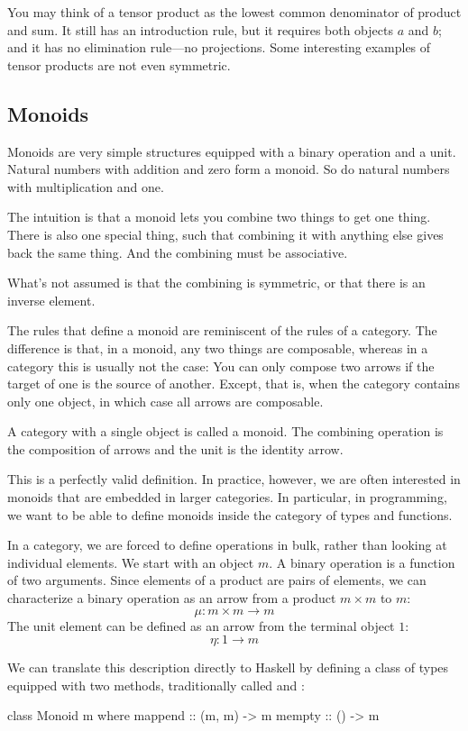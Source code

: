 \documentclass[DaoFP]{subfiles}
\begin{document}
You may think of a tensor product as the lowest common denominator of product and sum. It still has an introduction rule, but it requires both objects $a$ and $b$; and it has no elimination rule---no projections. Some interesting examples of tensor products are not even symmetric. 

\subsection{Monoids}

Monoids are very simple structures equipped with a binary operation and a unit. Natural numbers with addition and zero form a monoid. So do natural numbers with multiplication and one. 

The intuition is that a monoid lets you combine two things to get one thing. There is also one special thing, such that combining it with anything else gives back the same thing. And the combining must be associative. 

What's not assumed is that the combining is symmetric, or that there is an inverse element.

The rules that define a monoid are reminiscent of the rules of a category. The difference is that, in a monoid, any two things are composable, whereas in a category this is usually not the case: You can only compose two arrows if the target of one is the source of another. Except, that is, when the category contains only one object, in which case all arrows are composable.

A category with a single object is called a monoid. The combining operation is the composition of arrows and the unit is the identity arrow. 

This is a perfectly valid definition. In practice, however, we are often interested in monoids that are embedded in larger categories. In particular, in programming, we want to be able to define monoids inside the category of types and functions. 

In a category, we are forced to define operations in bulk, rather than looking at individual elements. We start with an object $m$. A binary operation is a function of two arguments. Since elements of a product are pairs of elements, we can characterize a binary operation as an arrow from a product $m \times m$ to $m$:
\[ \mu \colon m \times m \to m \]
The unit element can be defined as an arrow from the terminal object $1$:
\[ \eta \colon 1 \to m \]

We can translate this description directly to Haskell by defining a class of types equipped with two methods, traditionally called  and :
\begin{haskell}
class Monoid m where
  mappend :: (m, m) -> m
  mempty  :: () -> m
\end{haskell}
\end{document}

